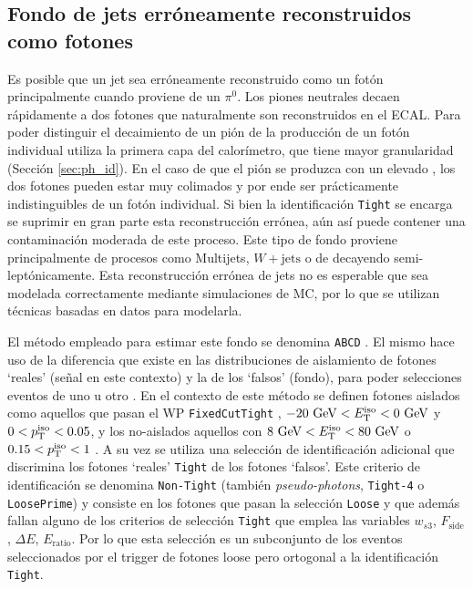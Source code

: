 \subsection{Fondo de jets erróneamente reconstruidos como fotones}\label{sec:jfakes}

Es posible que un jet sea erróneamente reconstruido como un fotón principalmente cuando proviene de un $\pi^0$. Los piones neutrales decaen rápidamente a dos fotones que naturalmente son reconstruidos en el ECAL. Para poder distinguir el decaimiento de un pión de la producción de un fotón individual utiliza la primera capa del calorímetro, que tiene mayor granularidad (Sección \ref{sec:ph_id}). En el caso de que el pión se produzca con un elevado \pt, los dos fotones pueden estar muy colimados y por ende ser prácticamente indistinguibles de un fotón individual. Si bien la identificación \texttt{Tight} se encarga se suprimir en gran parte esta reconstrucción errónea, aún así puede contener una contaminación moderada de este proceso. Este tipo de fondo proviene principalmente de procesos como Multijets, $W+\text{jets}$ o de \ttbar decayendo semi-leptónicamente. Esta reconstrucción errónea de jets no es esperable que sea modelada correctamente mediante simulaciones de MC, por lo que se utilizan técnicas basadas en datos para modelarla.

El método empleado para estimar este fondo se denomina \texttt{ABCD} \cite{Alonso:2233238}. El mismo hace uso de la diferencia que existe en las distribuciones de aislamiento de fotones `reales' (señal en este contexto) y la de los `falsos' (fondo), para poder selecciones eventos de uno u otro . En el contexto de este método se definen fotones aislados como aquellos que pasan el WP \texttt{FixedCutTight} , $-20\ \gev<\ETiso<0\ \gev$ y $0<p_{\text{T}}^{\text{iso}}<0.05$, y los no-aislados aquellos con $8\ \gev<\ETiso<80\ \gev$ o $0.15<p_{\text{T}}^{\text{iso}}<1$ . A su vez se utiliza una selección de identificación adicional que discrimina los fotones `reales' \texttt{Tight} de los fotones `falsos'. Este criterio de identificación se denomina \texttt{Non-Tight} (también \textit{pseudo-photons}, \texttt{Tight-4} o \texttt{LoosePrime}) y consiste en los fotones que pasan la selección \texttt{Loose} y que además fallan alguno de los criterios de selección \texttt{Tight} que emplea las variables $w_{s3}$, $F_{\text{side}}$, $\Delta E$, $E_{\text{ratio}}$. Por lo que esta selección es un subconjunto de los eventos seleccionados por el trigger de fotones loose pero ortogonal a la identificación \texttt{Tight}. 

